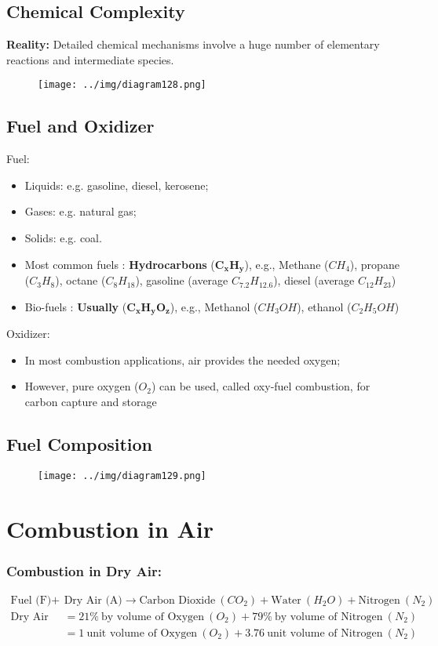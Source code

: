 \documentclass[class=report, crop=false, 12pt,a4paper]{standalone}
\numberwithin{equation}{section}
\begin{document}
\subsection{Chemical Complexity}
\textbf{Reality:} Detailed chemical mechanisms involve a huge number of elementary reactions and intermediate species.
\begin{figure}[H]
  \centering
  \texttt{[image: ../img/diagram128.png]}
  \caption{}
\end{figure}
\subsection{Fuel and Oxidizer}
Fuel:
\begin{itemize}[noitemsep]
  \item Liquids: e.g. gasoline, diesel, kerosene;
  \item Gases: e.g. natural gas;
  \item Solids: e.g. coal.
  \item Most common fuels : \textbf{Hydrocarbons} ($\mathbf{C_xH_y}$), e.g., Methane ($CH_4$), propane ($C_3H_8$), octane ($C_8H_{18}$), gasoline (average $C_{7.2}H_{12.6}$), diesel (average $C_{12}H_{23}$)
  \item Bio-fuels : \textbf{Usually} ($\mathbf{C_xH_yO_z}$), e.g., Methanol ($CH_3OH$), ethanol ($C_2H_5OH$)
\end{itemize}
Oxidizer:
\begin{itemize}[noitemsep]
  \item In most combustion applications, air provides the needed oxygen;
  \item However, pure oxygen ($O_2$) can be used, called oxy-fuel combustion, for carbon capture and storage
\end{itemize}
\subsection{Fuel Composition}
\begin{figure}[H]
  \centering
  \texttt{[image: ../img/diagram129.png]}
  \caption{}
\end{figure}
\section{Combustion in Air}
\subsubsection{Combustion in Dry Air:}
\begin{align*}
  \text{Fuel (F)} + &\text{Dry Air (A)} \longrightarrow \text{Carbon Dioxide} \ (CO_2) + \text{Water} \ (H_2O) + \text{Nitrogen} \ (N_2) \\[5pt]
  \text{Dry Air (A)} &= 21\% \ \text{by volume of Oxygen} \ (O_2) + 79\% \ \text{by volume of Nitrogen} \ (N_2) \\[5pt]
  &= 1 \ \text{unit volume of Oxygen} \ (O_2) + 3.76 \ \text{unit volume of Nitrogen} \ (N_2)
\end{align*}
\end{document}
